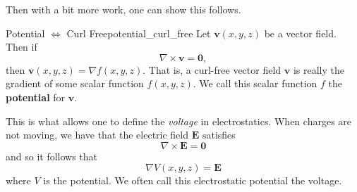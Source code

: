         Then with a bit more work, one can show this follows.
        
        \begin{thm}{Potential $\iff$ Curl Free}{potential_curl_free}
        Let $\mathbf{v}(x,y,z)$ be a vector field.  Then if 
        \[
        \nabla \times \mathbf{v} = \mathbf{0},
        \]
        then $\mathbf{v}(x,y,z) = \nabla f(x,y,z)$.  That is, a curl-free vector field $\mathbf{v}$ is really the gradient of some scalar function $f(x,y,z)$.  We call this scalar function $f$ the \textbf{potential} for $\mathbf{v}$.
        \end{thm}
        
        This is what allows one to define the \emph{voltage} in electrostatics.  When charges are not moving, we have that the electric field $\mathbf{E}$ satisfies
        \[
        \nabla \times \mathbf{E} = \mathbf{0}
        \]
        and so it follows that
        \[
        \nabla V(x,y,z) = \mathbf{E}
        \]
        where $V$ is the potential.  We often call this electrostatic potential the voltage.
